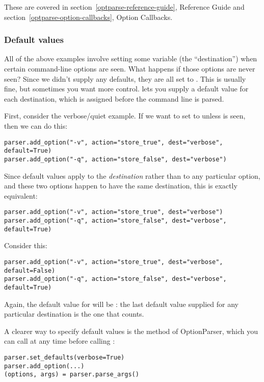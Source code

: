 These are covered in section~\ref{optparse-reference-guide}, Reference Guide and section~\ref{optparse-option-callbacks}, Option Callbacks.


\subsubsection{Default values\label{optparse-default-values}}

All of the above examples involve setting some variable (the
``destination'') when certain command-line options are seen.  What happens
if those options are never seen?  Since we didn't supply any defaults,
they are all set to .  This is usually fine, but sometimes you
want more control.   lets you supply a default value for each
destination, which is assigned before the command line is parsed.

First, consider the verbose/quiet example.  If we want  to set
 to  unless  is seen, then we can do this:
\begin{verbatim}
parser.add_option("-v", action="store_true", dest="verbose", default=True)
parser.add_option("-q", action="store_false", dest="verbose")
\end{verbatim}

Since default values apply to the \emph{destination} rather than to any
particular option, and these two options happen to have the same
destination, this is exactly equivalent:
\begin{verbatim}
parser.add_option("-v", action="store_true", dest="verbose")
parser.add_option("-q", action="store_false", dest="verbose", default=True)
\end{verbatim}

Consider this:
\begin{verbatim}
parser.add_option("-v", action="store_true", dest="verbose", default=False)
parser.add_option("-q", action="store_false", dest="verbose", default=True)
\end{verbatim}

Again, the default value for  will be : the last
default value supplied for any particular destination is the one that
counts.

A clearer way to specify default values is the 
method of OptionParser, which you can call at any time before calling
:
\begin{verbatim}
parser.set_defaults(verbose=True)
parser.add_option(...)
(options, args) = parser.parse_args()
\end{verbatim}

